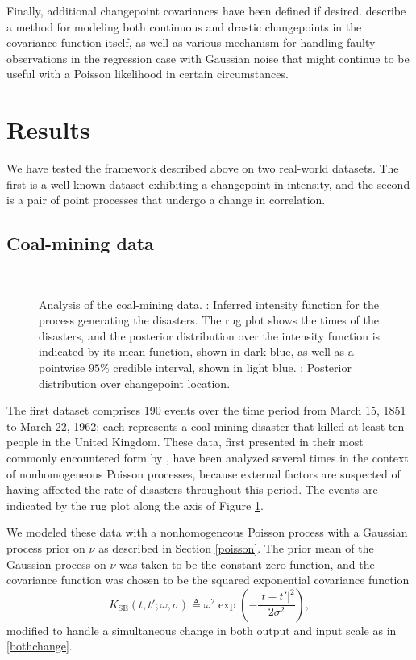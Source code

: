\documentclass{article}
\newcommand{\deq}{\triangleq}
\newcommand{\psff}[1]{\texttt{[image: figures/\#1.eps]}}
\begin{document}
Finally, additional changepoint covariances have been defined if
desired.  \citet{cpcj} describe a method for modeling both continuous
and drastic changepoints in the covariance function itself, as well as
various mechanism for handling faulty observations in the regression
case with Gaussian noise that might continue to be useful with a
Poisson likelihood in certain circumstances.

\section{Results}
\label{results}

We have tested the framework described above on two real-world
datasets.  The first is a well-known dataset exhibiting a changepoint
in intensity, and the second is a pair of point processes that undergo
a change in correlation.

\subsection{Coal-mining data}

\begin{figure}
  \centering
  \subfloat[][]{
    \psff{posterior}
    \label{posterior}
  }
  \\
  \subfloat[][]{
    \psff{changepoint}
    \label{changepoint}
  }
  \caption{Analysis of the coal-mining data.  :
    Inferred intensity function for the process generating the
    disasters.  The rug plot shows the times of the disasters, and the
    posterior distribution over the intensity function is indicated by
    its mean function, shown in dark blue, as well as a pointwise
    $95$\% credible interval, shown in light blue.
    : Posterior distribution over changepoint
    location.  }
  \label{coal}
\end{figure}

The first dataset comprises 190 events over the time period from March
15, 1851 to March 22, 1962; each represents a coal-mining disaster
that killed at least ten people in the United Kingdom.  These data,
first presented in their most commonly encountered form by
\citet{jarrett}, have been analyzed several times in the context of
nonhomogeneous Poisson processes, because external factors are
suspected of having affected the rate of disasters throughout this
period.  The events are indicated by the rug plot along the axis of
Figure \ref{coal}.

We modeled these data with a nonhomogeneous Poisson process with a
Gaussian process prior on $\nu$ as described in Section \ref{poisson}.
The prior mean of the Gaussian process on $\nu$ was taken to be the
constant zero function, and the covariance function was chosen to be
the squared exponential covariance function
\begin{equation}
  \label{sqdexp}
  K_{\text{SE}}(t, t'; \omega, \sigma)
  \deq
  \omega^2
  \exp
  \left(
  -\frac{ \lvert t - t' \rvert^2}{2\sigma^2}
  \right),
\end{equation}
modified to handle a simultaneous change in both output and input
scale as in \eqref{bothchange}.
\end{document}

